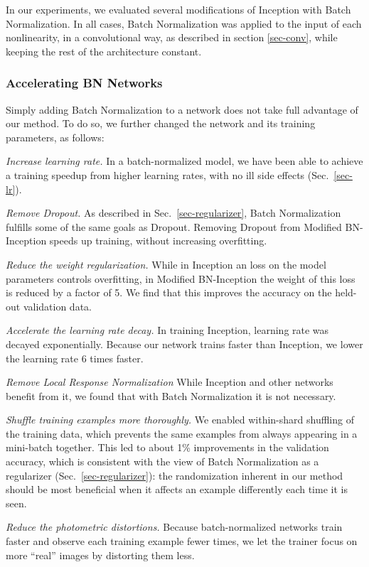 \documentclass[twocolumn]{article}
\begin{document}
In our experiments, we evaluated several modifications of Inception with Batch Normalization. In all cases, Batch Normalization was applied to the 
input of each nonlinearity, in a convolutional way, as described in section
\ref{sec-conv}, while keeping the rest of the architecture constant.

\subsubsection{Accelerating BN Networks}
\label{sec-accelerating}
Simply adding Batch Normalization to a network does not take full advantage of our method. To do so, we further changed the network and its training parameters, as follows:

{\em Increase learning rate.} In a batch-normalized model, we have been able to achieve a training speedup from higher learning rates, with no ill side effects (Sec.~\ref{sec-lr}).

 {\em Remove Dropout.} As described in Sec.~\ref{sec-regularizer}, Batch Normalization fulfills some of the same goals as Dropout. Removing Dropout from Modified BN-Inception speeds up training, without increasing overfitting. 
 
{\em Reduce the  weight regularization.} While in Inception an  loss on the model parameters controls overfitting, in Modified BN-Inception the weight of this loss is reduced by a factor of 5. We find that this improves the accuracy on the held-out validation data.

{\em Accelerate the learning rate decay.} In training Inception, learning rate was decayed exponentially. Because our network trains faster than Inception, we lower the learning rate  6 times faster.

{\em Remove Local Response Normalization}   While Inception and other networks \cite{dropout} benefit from it, we found that with Batch Normalization  it is not necessary.

{\em Shuffle training examples more thoroughly.} We enabled within-shard shuffling of the training data, which prevents the same examples from always appearing in a mini-batch together. This  led to about 1\% improvements in the validation accuracy, which is consistent with the view of Batch Normalization as a regularizer (Sec.~\ref{sec-regularizer}): the randomization inherent in our method should be most beneficial when it  affects an example differently each time it is seen.

{\em Reduce the photometric distortions.} Because batch-normalized networks train faster and observe each training example fewer times, we let the trainer focus on more ``real'' images by distorting them less.
\end{document}

